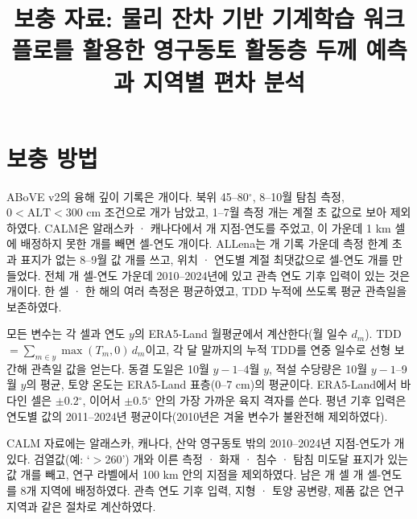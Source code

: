 \documentclass[pdflatex,sn-nature]{sn-jnl}
\begin{document}
\title{보충 자료: 물리 잔차 기반 기계학습 워크플로를 활용한 영구동토 활동층 두께 예측과 지역별 편차 분석}
\author[1]{}
\maketitle

\section{보충 방법}

ABoVE v2\cite{Moore2025}의 융해 깊이 기록은 \nqcAboveRaw{}개이다. 북위 45--80$^\circ$, 8--10월 탐침 측정, $0<\mathrm{ALT}<300$ cm 조건으로 \nqcAboveKept{}개가 남았고, 1--7월 측정 \nqcAboveEarly{}개는 계절 초 값으로 보아 제외하였다. CALM\cite{Streletskiy2025}은 알래스카 · 캐나다에서 \nqcCalmSy{}개 지점-연도를 주었고, 이 가운데 1 km 셀에 배정하지 못한 \nqcCalmNoloc{}개를 빼면 셀-연도 \nqcCalmCy{}개이다. ALLena\cite{Veremeeva2025}는 \nqcLenaRaw{}개 기록 가운데 측정 한계 초과 표지가 없는 8--9월 값 \nqcLenaEos{}개를 쓰고, 위치 · 연도별 계절 최댓값으로 셀-연도 \nqcLenaCy{}개를 만들었다. 전체 \nqcTotalCy{}개 셀-연도 가운데 2010--2024년에 있고 관측 연도 기후 입력이 있는 것은 \nqcTotalCyIn{}개이다. 한 셀 · 한 해의 여러 측정은 평균하였고, TDD 누적에 쓰도록 평균 관측일을 보존하였다.

모든 변수는 각 셀과 연도 $y$의 ERA5-Land 월평균에서 계산한다(월 일수 $d_m$). TDD $=\sum_{m\in y}\max(T_m,0)\,d_m$이고, 각 달 말까지의 누적 TDD를 연중 일수로 선형 보간해 관측일 값을 얻는다. 동결 도일은 10월 $y-1$--4월 $y$, 적설 수당량은 10월 $y-1$--9월 $y$의 평균, 토양 온도는 ERA5-Land 표층(0--7 cm)의 평균이다. ERA5-Land에서 바다인 셀은 $\pm$0.2$^\circ$, 이어서 $\pm$0.5$^\circ$ 안의 가장 가까운 육지 격자를 쓴다. 평년 기후 입력은 연도별 값의 2011--2024년 평균이다(2010년은 겨울 변수가 불완전해 제외하였다).

CALM 자료\cite{Streletskiy2025}에는 알래스카, 캐나다, 산악 영구동토 밖의 2010--2024년 지점-연도가 \nextRawSy{}개 있다. 검열값(예: `$>$260') \nextCens{}개와 이른 측정 · 화재 · 침수 · 탐침 미도달 표지가 있는 값 \nextQcRm{}개를 빼고, 연구 라벨에서 100 km 안의 지점을 제외하였다. 남은 \nextcells{}개 셀 \nextcy{}개 셀-연도를 8개 지역에 배정하였다. 관측 연도 기후 입력, 지형 · 토양 공변량, 제품 값은 연구 지역과 같은 절차로 계산하였다.
\end{document}
